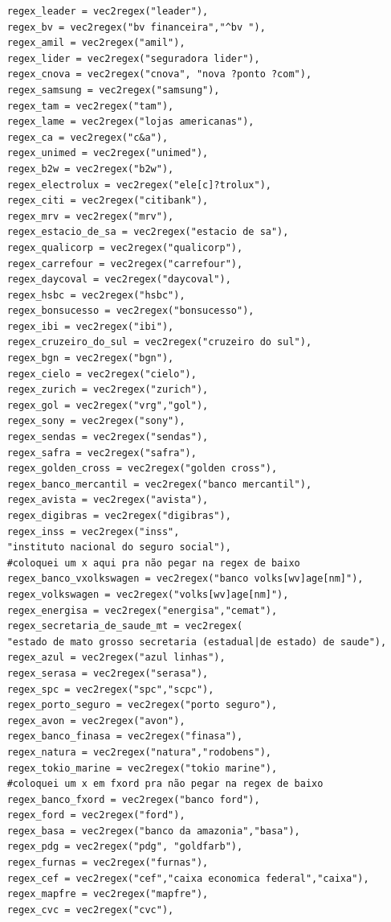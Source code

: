 \documentclass[]{report}
\begin{document}
\begin{verbatim}
    regex_leader = vec2regex("leader"),
    regex_bv = vec2regex("bv financeira","^bv "),
    regex_amil = vec2regex("amil"),
    regex_lider = vec2regex("seguradora lider"),
    regex_cnova = vec2regex("cnova", "nova ?ponto ?com"),
    regex_samsung = vec2regex("samsung"),
    regex_tam = vec2regex("tam"),
    regex_lame = vec2regex("lojas americanas"),
    regex_ca = vec2regex("c&a"),
    regex_unimed = vec2regex("unimed"),
    regex_b2w = vec2regex("b2w"),
    regex_electrolux = vec2regex("ele[c]?trolux"),
    regex_citi = vec2regex("citibank"),
    regex_mrv = vec2regex("mrv"),
    regex_estacio_de_sa = vec2regex("estacio de sa"),
    regex_qualicorp = vec2regex("qualicorp"),
    regex_carrefour = vec2regex("carrefour"),
    regex_daycoval = vec2regex("daycoval"),
    regex_hsbc = vec2regex("hsbc"),
    regex_bonsucesso = vec2regex("bonsucesso"),
    regex_ibi = vec2regex("ibi"),
    regex_cruzeiro_do_sul = vec2regex("cruzeiro do sul"),
    regex_bgn = vec2regex("bgn"),
    regex_cielo = vec2regex("cielo"),
    regex_zurich = vec2regex("zurich"),
    regex_gol = vec2regex("vrg","gol"),
    regex_sony = vec2regex("sony"),
    regex_sendas = vec2regex("sendas"),
    regex_safra = vec2regex("safra"),
    regex_golden_cross = vec2regex("golden cross"),
    regex_banco_mercantil = vec2regex("banco mercantil"),
    regex_avista = vec2regex("avista"),
    regex_digibras = vec2regex("digibras"),
    regex_inss = vec2regex("inss",
    "instituto nacional do seguro social"),
    #coloquei um x aqui pra não pegar na regex de baixo
    regex_banco_vxolkswagen = vec2regex("banco volks[wv]age[nm]"),
    regex_volkswagen = vec2regex("volks[wv]age[nm]"),
    regex_energisa = vec2regex("energisa","cemat"),
    regex_secretaria_de_saude_mt = vec2regex(
    "estado de mato grosso secretaria (estadual|de estado) de saude"),
    regex_azul = vec2regex("azul linhas"),
    regex_serasa = vec2regex("serasa"),
    regex_spc = vec2regex("spc","scpc"),
    regex_porto_seguro = vec2regex("porto seguro"),
    regex_avon = vec2regex("avon"),
    regex_banco_finasa = vec2regex("finasa"),
    regex_natura = vec2regex("natura","rodobens"),
    regex_tokio_marine = vec2regex("tokio marine"),
    #coloquei um x em fxord pra não pegar na regex de baixo
    regex_banco_fxord = vec2regex("banco ford"),
    regex_ford = vec2regex("ford"),
    regex_basa = vec2regex("banco da amazonia","basa"),
    regex_pdg = vec2regex("pdg", "goldfarb"),
    regex_furnas = vec2regex("furnas"),
    regex_cef = vec2regex("cef","caixa economica federal","caixa"),
    regex_mapfre = vec2regex("mapfre"),
    regex_cvc = vec2regex("cvc"),

\end{verbatim}
\end{document}

